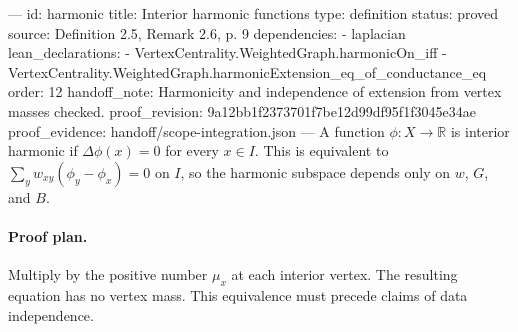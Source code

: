 ---
id: harmonic
title: Interior harmonic functions
type: definition
status: proved
source: Definition 2.5, Remark 2.6, p. 9
dependencies:
- laplacian
lean_declarations:
- VertexCentrality.WeightedGraph.harmonicOn_iff
- VertexCentrality.WeightedGraph.harmonicExtension_eq_of_conductance_eq
order: 12
handoff_note: Harmonicity and independence of extension from vertex masses checked.
proof_revision: 9a12bb1f2373701f7be12d99df95f1f3045e34ae
proof_evidence: handoff/scope-integration.json
---
A function $\phi:X\to\mathbb R$ is interior harmonic if $\Delta\phi(x)=0$ for every $x\in I$. This is equivalent to $\sum_yw_{xy}(\phi_y-\phi_x)=0$ on $I$, so the harmonic subspace depends only on $w$, $G$, and $B$.

\paragraph{Proof plan.}
Multiply by the positive number $\mu_x$ at each interior vertex. The resulting equation has no vertex mass. This equivalence must precede claims of data independence.
